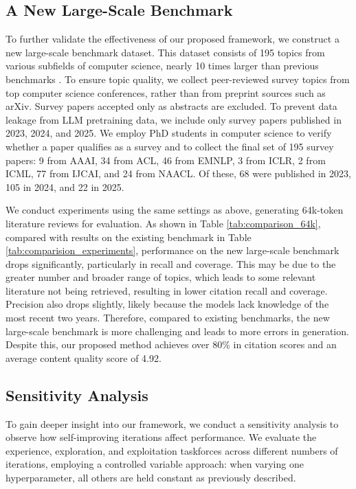 \documentclass[manuscript,review,anonymous]{acmart}
\begin{document}
\subsection{A New Large-Scale Benchmark}

To further validate the effectiveness of our proposed framework, we construct a new large-scale benchmark dataset. This dataset consists of 195 topics from various subfields of computer science, nearly 10 times larger than previous benchmarks \cite{wang2024autosurvey, liang2025surveyx}. To ensure topic quality, we collect peer-reviewed survey topics from top computer science conferences, rather than from preprint sources such as arXiv. Survey papers accepted only as abstracts are excluded. To prevent data leakage from LLM pretraining data, we include only survey papers published in 2023, 2024, and 2025. We employ PhD students in computer science to verify whether a paper qualifies as a survey and to collect the final set of 195 survey papers: 9 from AAAI, 34 from ACL, 46 from EMNLP, 3 from ICLR, 2 from ICML, 77 from IJCAI, and 24 from NAACL. Of these, 68 were published in 2023, 105 in 2024, and 22 in 2025.

We conduct experiments using the same settings as above, generating 64k-token literature reviews for evaluation. As shown in Table \ref{tab:comparison_64k}, compared with results on the existing benchmark in Table \ref{tab:comparision_experiments}, performance on the new large-scale benchmark drops significantly, particularly in recall and coverage. This may be due to the greater number and broader range of topics, which leads to some relevant literature not being retrieved, resulting in lower citation recall and coverage. Precision also drops slightly, likely because the models lack knowledge of the most recent two years. Therefore, compared to existing benchmarks, the new large-scale benchmark is more challenging and leads to more errors in generation. Despite this, our proposed method achieves over 80\% in citation scores and an average content quality score of 4.92.

\subsection{Sensitivity Analysis}

To gain deeper insight into our framework, we conduct a sensitivity analysis to observe how self-improving iterations affect performance. We evaluate the experience, exploration, and exploitation taskforces across different numbers of iterations, employing a controlled variable approach: when varying one hyperparameter, all others are held constant as previously described.
\end{document}
